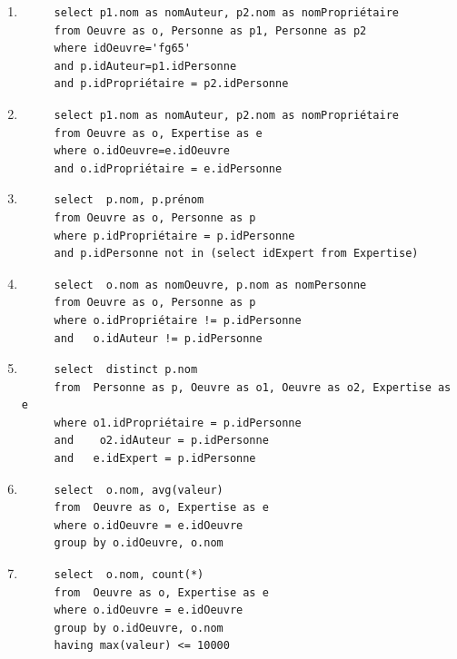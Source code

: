 \begin{solution}
\begin{enumerate}
  \item \begin{verbatim}
     select p1.nom as nomAuteur, p2.nom as nomPropriétaire
     from Oeuvre as o, Personne as p1, Personne as p2
     where idOeuvre='fg65'
     and p.idAuteur=p1.idPersonne
     and p.idPropriétaire = p2.idPersonne
  \end{verbatim}

  \item
  \begin{verbatim}
     select p1.nom as nomAuteur, p2.nom as nomPropriétaire
     from Oeuvre as o, Expertise as e
     where o.idOeuvre=e.idOeuvre
     and o.idPropriétaire = e.idPersonne
  \end{verbatim}

   \item \begin{verbatim}
     select  p.nom, p.prénom
     from Oeuvre as o, Personne as p
     where p.idPropriétaire = p.idPersonne
     and p.idPersonne not in (select idExpert from Expertise)
  \end{verbatim}

     \item \begin{verbatim}
     select  o.nom as nomOeuvre, p.nom as nomPersonne
     from Oeuvre as o, Personne as p
     where o.idPropriétaire != p.idPersonne
     and   o.idAuteur != p.idPersonne
  \end{verbatim}

     \item \begin{verbatim}
     select  distinct p.nom
     from  Personne as p, Oeuvre as o1, Oeuvre as o2, Expertise as e
     where o1.idPropriétaire = p.idPersonne
     and    o2.idAuteur = p.idPersonne
     and   e.idExpert = p.idPersonne
  \end{verbatim}

       \item \begin{verbatim}
     select  o.nom, avg(valeur)
     from  Oeuvre as o, Expertise as e
     where o.idOeuvre = e.idOeuvre
     group by o.idOeuvre, o.nom
  \end{verbatim}

        \item \begin{verbatim}
     select  o.nom, count(*)
     from  Oeuvre as o, Expertise as e
     where o.idOeuvre = e.idOeuvre
     group by o.idOeuvre, o.nom
     having max(valeur) <= 10000
  \end{verbatim}
\end{enumerate}

\end{solution}

